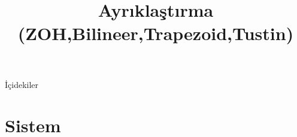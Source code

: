 
\title[Ders 1] {Ayrıklaştırma (ZOH,Bilineer,Trapezoid,Tustin)}

\frame{\titlepage}
\begin{frame}[fragile]{İçidekiler}
    \tableofcontents
\end{frame}
\section{Sistem}
\begin{frame}[fragile]{}

\end{frame}
